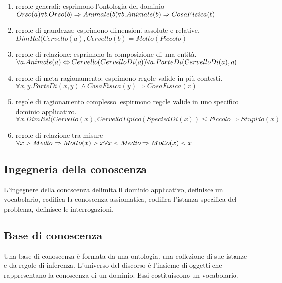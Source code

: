 \begin{enumerate}
	
	\item regole generali: esprimono l'ontologia del dominio. \\
	$Orso(a)\\
	\forall b.Orso(b)\Rightarrow Animale(b)\\
	\forall b.Animale(b)\Rightarrow CosaFisica(b)$
	
	\item regole di grandezza: esprimono dimensioni assolute e relative. \\
	$
	DimRel(Cervello(a),Cervello(b)=Molto(Piccolo)
	$
	
	\item regole di relazione: esprimono la composizione di una entità. \\
	$
	\forall a.Animale(a)\Leftrightarrow Cervello(CervelloDi(a))\\
	\forall a.ParteDi(CervelloDi(a),a)
	$
	
	\item regole di meta-ragionamento: esprimono regole valide in più contesti. \\
	$
	\forall x,y.ParteDi(x,y)\wedge CosaFisica(y)\Rightarrow CosaFisica(x)
	$
	
	\item regole di ragionamento complesso: espirmono regole valide in uno specifico dominio applicativo. \\
	$
	\forall x.DimRel(Cervello(x),CervelloTipico(SpeciedDi(x))\leq Piccolo \Rightarrow Stupido(x)
	$
	
	\item regole di relazione tra misure \\
	$
	\forall x>Medio\Rightarrow Molto(x)>x \\
	\forall x<Medio\Rightarrow Molto(x)<x \\
	$
\end{enumerate}


\subsection{Ingegneria della conoscenza}
L'ingegnere della conoscenza delimita il dominio applicativo, definisce un vocabolario, codifica la conoscenza assiomatica, codifica l'istanza specifica del problema, definisce le interrogazioni.


\subsection{Base di conoscenza}
Una base di conoscenza è formata da una ontologia, una collezione di sue istanze e da regole di inferenza.
L'universo del discorso è l'insieme di oggetti che rappresentano la conoscenza di un dominio. Essi costituiscono un vocabolario.


